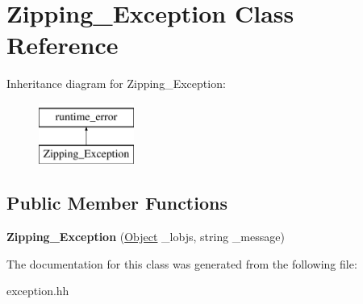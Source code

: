 \hypertarget{classZipping__Exception}{\section{Zipping\-\_\-\-Exception Class Reference}
\label{classZipping__Exception}
}
Inheritance diagram for Zipping\-\_\-\-Exception\-:\begin{figure}[H]
\begin{center}
\leavevmode
\includegraphics[height=2.000000cm]{classZipping__Exception}
\end{center}
\end{figure}
\subsection*{Public Member Functions}
\begin{DoxyCompactItemize}
\item 
\hypertarget{classZipping__Exception_a7ea62c850ba54f7644f156dcb7c21826}{{\bfseries Zipping\-\_\-\-Exception} (\hyperlink{classCell}{Object} \-\_\-lobjs, string \-\_\-message)}\label{classZipping__Exception_a7ea62c850ba54f7644f156dcb7c21826}

\end{DoxyCompactItemize}


The documentation for this class was generated from the following file\-:\begin{DoxyCompactItemize}
\item 
exception.\-hh\end{DoxyCompactItemize}
